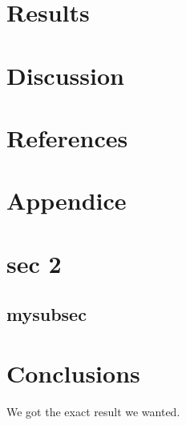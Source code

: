 \documentclass[a4paper,11pt]{article}
\begin{document}
\section{Results}
\section{Discussion}
\section{References}
\section{Appendice}
\section{sec 2}

\subsection{mysubsec}
\section{Conclusions}
We got the exact result we wanted.
\end{document}
